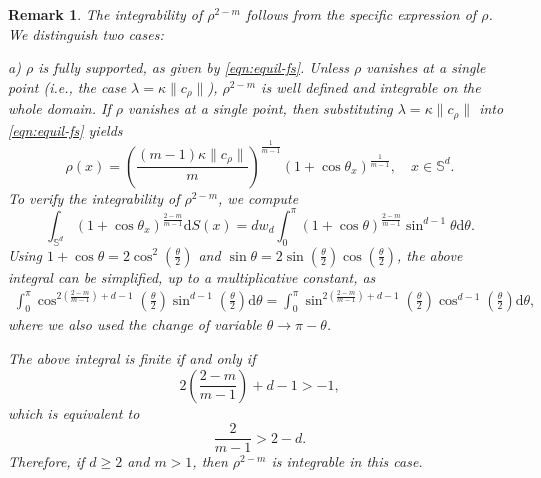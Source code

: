 \documentclass[11pt]{amsart}
\newtheorem{remark}{Remark}[section]
\newcommand{\bbs}{\mathbb S}
\def\d{\mathrm{d}}
\newcommand{\dx}{\mathrm{d}S (x)}
\newcommand{\dm}{d} %
\begin{document}
\begin{remark} The integrability of $\rho^{2-m}$ follows from the specific expression of $\rho$. We distinguish two cases:

a) $\rho$ is fully supported, as given by \eqref{eqn:equil-fs}. Unless $\rho$ vanishes at a single point (i.e., the case $\lambda=\kappa\|c_\rho\|$), $\rho^{2-m}$ is well defined and integrable on the whole domain. If $\rho$ vanishes at a single point, then substituting $\lambda=\kappa\|c_\rho\|$ into \eqref{eqn:equil-fs} yields
\[
\rho(x)=\left(\frac{(m-1)\kappa\|c_\rho\|}{m}\right)^{\frac{1}{m-1}}(1+\cos\theta_x)^{\frac{1}{m-1}},\quad x\in\bbs^\dm.
\]
To verify the integrability of $\rho^{2-m}$, we compute
\[
\int_{\bbs^\dm}(1+\cos\theta_x)^{\frac{2-m}{m-1}}\dx
=
\dm w_\dm \int_0^\pi (1+\cos\theta)^{\frac{2-m}{m-1}}\sin^{\dm-1}\theta\d\theta.
\]
Using $1+\cos\theta=2\cos^2\left(\frac{\theta}{2}\right)$ and $\sin\theta=2\sin\left(\frac{\theta}{2}\right)\cos\left(\frac{\theta}{2}\right)$, the above integral can be simplified, up to a multiplicative constant, as
\begin{align*}\int_0^\pi
\cos^{2\left(\frac{2-m}{m-1}\right)+\dm-1}
\left(\frac{\theta}{2}\right)
\sin^{\dm-1}\left(\frac{\theta}{2}\right)\d\theta
=\int_0^\pi
\sin^{2\left(\frac{2-m}{m-1}\right)+\dm-1}
\left(\frac{\theta}{2}\right)
\cos^{\dm-1}\left(\frac{\theta}{2}\right)\d\theta,
\end{align*}
where we also used the change of variable $ \theta\to\pi-\theta$.

The above integral is finite if and only if
\[
2\left(\frac{2-m}{m-1}\right)+\dm-1>-1,
\]
which is equivalent to
\[
\frac{2}{m-1}>2-\dm.
\]
Therefore, if $\dm\geq2$ and $m>1$, then $\rho^{2-m}$ is integrable in this case.
\smallskip


\end{remark}
\end{document}
